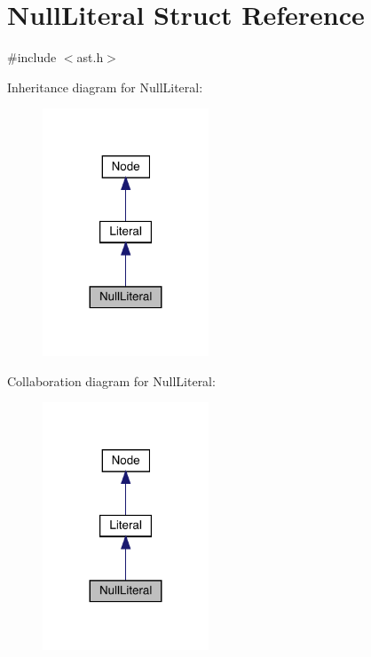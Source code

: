 \hypertarget{struct_null_literal}{}\section{Null\+Literal Struct Reference}
\label{struct_null_literal}


{\ttfamily \#include $<$ast.\+h$>$}



Inheritance diagram for Null\+Literal\+:\nopagebreak
\begin{figure}[H]
\begin{center}
\leavevmode
\includegraphics[width=140pt]{struct_null_literal__inherit__graph}
\end{center}
\end{figure}


Collaboration diagram for Null\+Literal\+:\nopagebreak
\begin{figure}[H]
\begin{center}
\leavevmode
\includegraphics[width=140pt]{struct_null_literal__coll__graph}
\end{center}
\end{figure}

